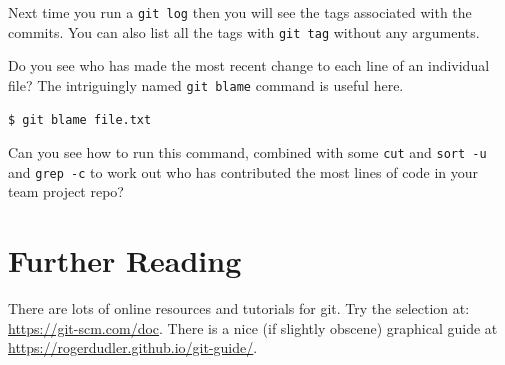 \documentclass{article}
\begin{document}
Next time you run a \texttt{git log} then you will see the tags associated with the commits. You can also list all the tags with \texttt{git tag} without any arguments.


Do you see who has made the most recent change to each line of an individual file? The intriguingly named \texttt{git blame} command is useful here.


\begin{lstlisting}[style=BashInputStyle]
    $ git blame file.txt
\end{lstlisting}

Can you see how to run this command, combined with some \texttt{cut} and \texttt{sort -u} and \texttt{grep -c} to work out who has contributed the most lines of code in your team project repo?



\section*{Further Reading}

There are lots of online resources and tutorials for git.
Try the selection at: \url{https://git-scm.com/doc}.
There is a nice (if slightly obscene) graphical guide at 
\url{https://rogerdudler.github.io/git-guide/}.
\end{document}
